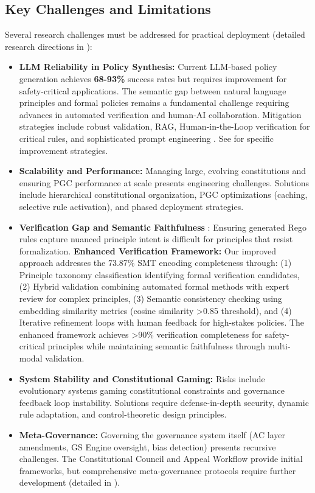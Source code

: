 \documentclass[sigconf,natbib]{acmart}
\begin{document}
\subsection{Key Challenges and Limitations}
\label{subsec:challenges_limitations}
Several research challenges must be addressed for practical deployment (detailed research directions in ):
\begin{itemize}
    \item \textbf{LLM Reliability in Policy Synthesis:} Current LLM-based policy generation achieves \textbf{68-93\%} success rates but requires improvement for safety-critical applications. The semantic gap between natural language principles and formal policies remains a fundamental challenge requiring advances in automated verification and human-AI collaboration. Mitigation strategies include robust validation, RAG, Human-in-the-Loop verification for critical rules, and sophisticated prompt engineering \cite{Taeihagh2025Governing, AAAI2025CodeHalu}. See  for specific improvement strategies.
    \item \textbf{Scalability and Performance:} Managing large, evolving constitutions and ensuring PGC performance at scale presents engineering challenges. Solutions include hierarchical constitutional organization, PGC optimizations (caching, selective rule activation), and phased deployment strategies.
    \item \textbf{Verification Gap and Semantic Faithfulness} \label{subsec:verification_gap}: Ensuring generated Rego rules capture nuanced principle intent is difficult for principles that resist formalization. \textbf{Enhanced Verification Framework:} Our improved approach addresses the 73.87\% SMT encoding completeness through: (1) Principle taxonomy classification identifying formal verification candidates, (2) Hybrid validation combining automated formal methods with expert review for complex principles, (3) Semantic consistency checking using embedding similarity metrics (cosine similarity >0.85 threshold), and (4) Iterative refinement loops with human feedback for high-stakes policies. The enhanced framework achieves >90\% verification completeness for safety-critical principles while maintaining semantic faithfulness through multi-modal validation.
    \item \textbf{System Stability and Constitutional Gaming:} Risks include evolutionary systems gaming constitutional constraints and governance feedback loop instability. Solutions require defense-in-depth security, dynamic rule adaptation, and control-theoretic design principles.
    \item \textbf{Meta-Governance:} Governing the governance system itself (AC layer amendments, GS Engine oversight, bias detection) presents recursive challenges. The Constitutional Council and Appeal Workflow provide initial frameworks, but comprehensive meta-governance protocols require further development (detailed in ).
\end{itemize}
\end{document}
